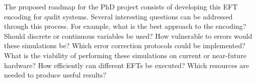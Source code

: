 The proposed roadmap for the PhD project consists of developing this EFT encoding for qudit systems. Several interesting questions can be addressed through this process. For example, what is the best approach to the encoding? Should discrete or continuous variables be used? How vulnerable to errors would these simulations be? Which error correction protocols could be implemented? What is the viability of performing these simulations on current or near-future hardware? How efficiently can different EFTs be executed? Which resources are needed to produce useful results?

